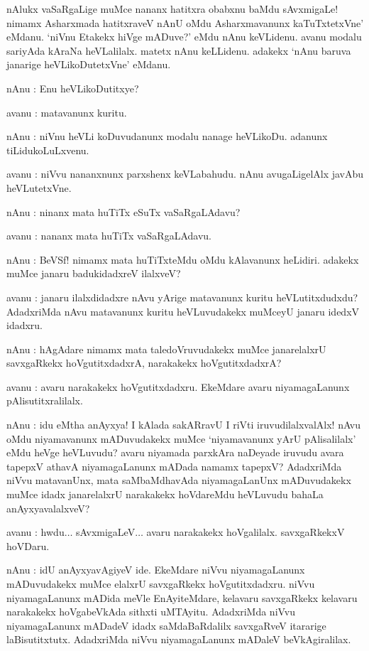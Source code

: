 nAlukx vaSaRgaLige muMce nananx hatitxra obabxnu baMdu sAvxmigaLe! nimamx Asharxmada hatitxraveV nAnU oMdu Asharxmavanunx kaTuTxtetxVne' eMdanu. `niVnu Etakekx hiVge mADuve?' eMdu nAnu keVLidenu. avanu modalu sariyAda kAraNa heVLalilalx. matetx nAnu keLLidenu. adakekx `nAnu baruva janarige heVLikoDutetxVne' eMdanu.

nAnu : Enu heVLikoDutitxye?

avanu : matavanunx kuritu.

nAnu : niVnu heVLi koDuvudanunx modalu nanage heVLikoDu. adanunx 
tiLidukoLuLxvenu.

avanu : niVvu nananxnunx parxshenx keVLabahudu. nAnu avugaLigelAlx 
javAbu heVLutetxVne.

nAnu : ninanx mata huTiTx eSuTx vaSaRgaLAdavu?

avanu : nananx mata huTiTx {} vaSaRgaLAdavu.

nAnu : BeVSf! nimamx mata huTiTxteMdu oMdu kAlavanunx heLidiri. adakekx muMce janaru badukidadxreV ilalxveV?

avanu : janaru ilalxdidadxre nAvu yArige matavanunx kuritu heVLutitxdudxdu? AdadxriMda nAvu matavanunx kuritu heVLuvudakekx muMceyU janaru idedxV idadxru.

nAnu : hAgAdare nimamx mata taledoVruvudakekx muMce janarelalxrU savxgaRkekx hoVgutitxdadxrA, narakakekx hoVgutitxdadxrA?

avanu : avaru narakakekx hoVgutitxdadxru. EkeMdare avaru niyamagaLanunx pAlisutitxralilalx.

nAnu : idu eMtha anAyxya! I kAlada sakARravU I riVti iruvudilalxvalAlx! nAvu oMdu niyamavanunx mADuvudakekx muMce `niyamavanunx yArU pAlisalilalx' eMdu heVge heVLuvudu? avaru niyamada parxkAra naDeyade iruvudu avara tapepxV athavA niyamagaLanunx mADada namamx tapepxV? AdadxriMda niVvu matavanUnx, mata saMbaMdhavAda niyamagaLanUnx mADuvudakekx muMce idadx janarelalxrU narakakekx hoVdareMdu heVLuvudu bahaLa anAyxyavalalxveV?

avanu : hwdu$\ldots$ sAvxmigaLeV$\ldots$ avaru narakakekx hoVgalilalx. savxgaRkekxV hoVDaru.

nAnu : idU anAyxyavAgiyeV ide. EkeMdare niVvu niyamagaLanunx mADuvudakekx muMce elalxrU savxgaRkekx hoVgutitxdadxru. niVvu niyamagaLanunx mADida meVle EnAyiteMdare, kelavaru savxgaRkekx kelavaru narakakekx hoVgabeVkAda sithxti uMTAyitu. AdadxriMda niVvu niyamagaLanunx mADadeV idadx saMdaBaRdalilx savxgaRveV itararige laBisutitxtutx. AdadxriMda niVvu niyamagaLanunx mADaleV beVkAgiralilax.

